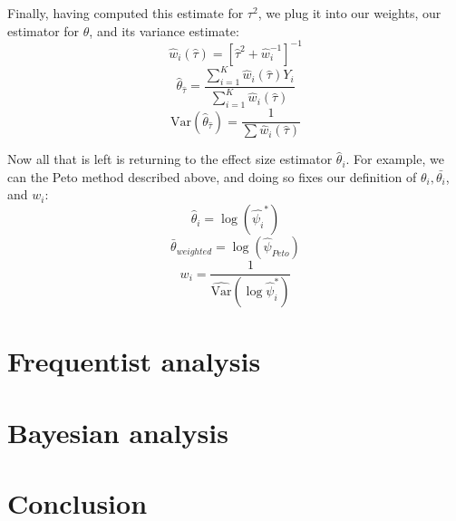 \documentclass[fleqn,10pt]{SelfArx} %
\begin{document}
Finally, having computed this estimate for $\tau^2$, we plug it into our weights, our estimator for $\theta$, and its variance estimate:
\[\hat{w}_i({\hat{\tau}}) = [\hat{\tau}^2 + \hat{w}_i^{-1}]^{-1}\]
\[\hat{\theta}_{\hat{\tau}} =  \frac{\sum_{i = 1}^K \hat{w}_i(\hat{\tau}) Y_i }{\sum_{i = 1}^K \hat{w}_i(\hat{\tau})}\]
\[\textrm{Var}(\hat{\theta}_{\hat{\tau}}) = \frac{1}{\sum\hat{w}_i(\hat{\tau})}\]

Now all that is left is returning to the effect size estimator $\hat{\theta}_i$. For example, we can the Peto method described above, and doing so fixes our definition of $\theta_i, \bar{\theta_i}$, and $w_i$\cite{Methods}:
\[\hat{\theta}_i = \log (\hat{\psi_i}^*)\]
\[\bar{\theta}_{weighted} = \log(\hat{\psi}_{Peto})\]
\[w_i = \frac{1}{\widehat{\textrm{Var}}(\log \hat{\psi}_i^*)}\]




\section{Frequentist analysis}




\section{Bayesian analysis}


\section{Conclusion}





\end{document}
